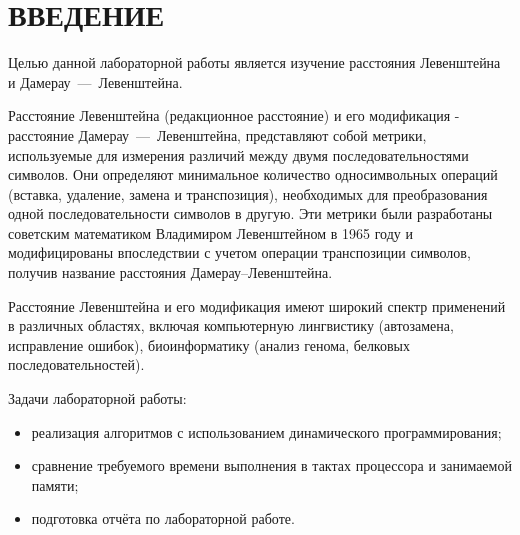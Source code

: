 \section*{ВВЕДЕНИЕ}

Целью данной лабораторной работы является изучение расстояния Левенштейна и Дамерау~---~Левенштейна.

Расстояние Левенштейна (редакционное расстояние) и его модификация - расстояние Дамерау~---~Левенштейна, представляют собой метрики, используемые для измерения различий между двумя последовательностями символов.
Они определяют минимальное количество односимвольных операций (вставка, удаление, замена и транспозиция), необходимых для преобразования одной последовательности символов в другую.
Эти метрики были разработаны советским математиком Владимиром Левенштейном в 1965 году и модифицированы впоследствии с учетом операции транспозиции символов, получив название расстояния Дамерау--Левенштейна.

Расстояние Левенштейна и его модификация имеют широкий спектр применений в различных областях, включая компьютерную лингвистику (автозамена, исправление ошибок), биоинформатику (анализ генома, белковых последовательностей).

Задачи лабораторной работы:
\begin{itemize}
    \item реализация алгоритмов с использованием динамического программирования;
    \item сравнение требуемого времени выполнения в тактах процессора и занимаемой памяти;
    \item подготовка отчёта по лабораторной работе.
\end{itemize}

